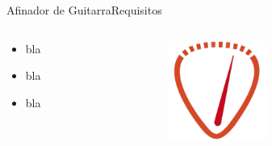 \begin{frame}[t]{Afinador de Guitarra}{Requisitos}

   \begin{columns}[t]
      \footnotesize
      \begin{column}{.4\textwidth}
         \begin{itemize}
            \item{bla}
            \item{bla}
            \item{bla}
         \end{itemize}
      \end{column}
      \hspace{2pt}
      \vrule
      \hspace{2pt}
      \begin{column}{.6\textwidth}
         \center\includegraphics[width=0.4\textwidth]{7_clase/afinador_icon}
      \end{column}
      \hspace{2pt}
   \end{columns}
   \vfill
   \note{
      \begin{itemize}
         \item{}
         \item{}
      \end{itemize}
   }
\end{frame}
